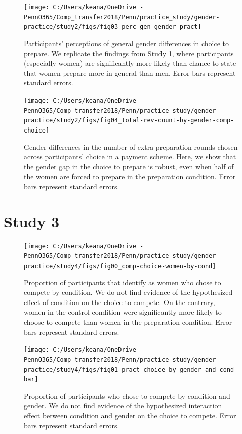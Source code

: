 \documentclass[a4paper, nobind]{templates/ociamthesis}
\begin{document}
\begin{figure}
\texttt{[image: C:/Users/keana/OneDrive - PennO365/Comp\_transfer2018/Penn/practice\_study/gender-practice/study2/figs/fig03\_perc-gen-gender-pract]} \caption{Participants' perceptions of general gender differences in choice to prepare. We replicate the findings from Study 1, where participants (especially women) are significantly more likely than chance to state that women prepare more in general than men. Error bars represent standard errors.}\label{fig:s203}
\end{figure}

\begin{figure}
\texttt{[image: C:/Users/keana/OneDrive - PennO365/Comp\_transfer2018/Penn/practice\_study/gender-practice/study2/figs/fig04\_total-rev-count-by-gender-comp-choice]} \caption{Gender differences in the number of extra preparation rounds chosen across participants' choice in a payment scheme. Here, we show that the gender gap in the choice to prepare is robust, even when half of the women are forced to prepare in the preparation condition. Error bars represent standard errors.}\label{fig:s204}
\end{figure}

\hypertarget{study-3-1}{%
\section{Study 3}\label{study-3-1}}

\begin{figure}
\texttt{[image: C:/Users/keana/OneDrive - PennO365/Comp\_transfer2018/Penn/practice\_study/gender-practice/study4/figs/fig00\_comp-choice-women-by-cond]} \caption{Proportion of participants that identify as women who chose to compete by condition. We do not find evidence of the hypothesized effect of condition on the choice to compete. On the contrary, women in the control condition were significantly more likely to choose to compete than women in the preparation condition. Error bars represent standard errors.}\label{fig:s300}
\end{figure}

\begin{figure}
\texttt{[image: C:/Users/keana/OneDrive - PennO365/Comp\_transfer2018/Penn/practice\_study/gender-practice/study4/figs/fig01\_pract-choice-by-gender-and-cond-bar]} \caption{Proportion of participants who chose to compete by condition and gender. We do not find evidence of the hypothesized interaction effect between condition and gender on the choice to compete. Error bars represent standard errors.}\label{fig:s301}
\end{figure}
\end{document}

